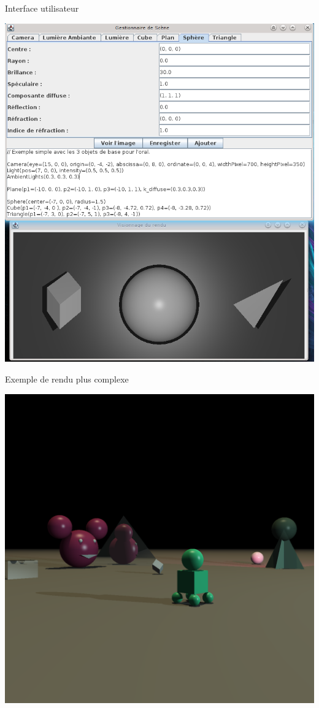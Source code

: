 \documentclass{beamer}
\begin{document}
  \begin{frame}{Interface utilisateur}
    \centerline{
      \includegraphics[height=0.8\paperheight, keepaspectratio=true]
      {screen2.png}
    }
  \end{frame}

  \begin{frame}{Exemple de rendu plus complexe}
    \centerline{
      \includegraphics[width=\textwidth, height=0.8\paperheight,
      keepaspectratio=true]{0377.png}
    }
  \end{frame}
\end{document}
